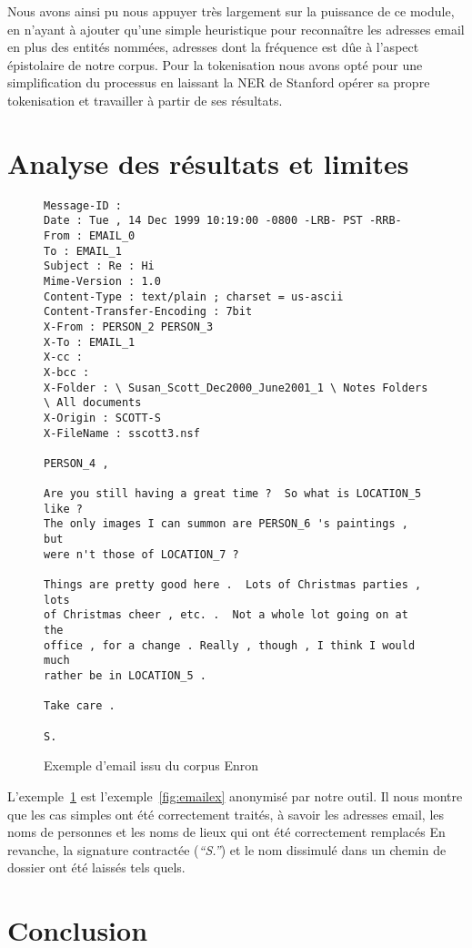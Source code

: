 \documentclass[11pt]{article}
\begin{document}
Nous avons ainsi pu nous appuyer très largement sur la puissance de ce module,
en n'ayant à ajouter qu'une simple heuristique pour reconnaître les adresses
email en plus des entités nommées, adresses dont la fréquence est dûe à l'aspect
épistolaire de notre corpus. Pour la tokenisation nous avons opté pour une
simplification du processus en laissant la NER de Stanford opérer sa propre
tokenisation et travailler à partir de ses résultats.

\section{Analyse des résultats et limites}

\begin{figure}[H]
\begin{verbatim}
Message-ID :
Date : Tue , 14 Dec 1999 10:19:00 -0800 -LRB- PST -RRB-
From : EMAIL_0
To : EMAIL_1
Subject : Re : Hi
Mime-Version : 1.0
Content-Type : text/plain ; charset = us-ascii
Content-Transfer-Encoding : 7bit
X-From : PERSON_2 PERSON_3
X-To : EMAIL_1
X-cc :
X-bcc :
X-Folder : \ Susan_Scott_Dec2000_June2001_1 \ Notes Folders \ All documents
X-Origin : SCOTT-S
X-FileName : sscott3.nsf

PERSON_4 ,

Are you still having a great time ?  So what is LOCATION_5 like ?
The only images I can summon are PERSON_6 's paintings , but
were n't those of LOCATION_7 ?

Things are pretty good here .  Lots of Christmas parties , lots
of Christmas cheer , etc. .  Not a whole lot going on at the
office , for a change . Really , though , I think I would much
rather be in LOCATION_5 .

Take care .

S.
\end{verbatim}
\caption{Exemple d'email issu du corpus Enron}
\label{fig:emailanon}
\end{figure}

L'exemple~\ref{fig:emailanon} est l'exemple~\ref{fig:emailex} anonymisé
par notre outil. Il nous montre que les cas simples ont été correctement
traités, à savoir les adresses email, les noms de personnes et les noms
de lieux qui ont été correctement remplacés En revanche, la signature contractée
(\textit{``S.''}) et le nom dissimulé dans un chemin de dossier ont été laissés
tels quels.

\section*{Conclusion}

\newpage
\tableofcontents
\end{document}
